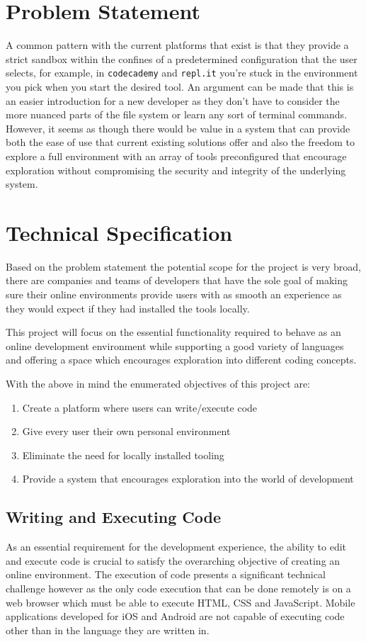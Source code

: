\section{Problem Statement} \label{section:probart-probstate}
A common pattern with the current platforms that exist is that they provide a strict sandbox within the confines of a predetermined configuration that the user selects, for example, in \texttt{codecademy} and \texttt{repl.it} you're stuck in the environment you pick when you start the desired tool. An argument can be made that this is an easier introduction for a new developer as they don't have to consider the more nuanced parts of the file system or learn any sort of terminal commands. However, it seems as though there would be value in a system that can provide both the ease of use that current existing solutions offer and also the freedom to explore a full environment with an array of tools preconfigured that encourage exploration without compromising the security and integrity of the underlying system.

\section{Technical Specification} \label{section:probart-techspec}
Based on the problem statement the potential scope for the project is very broad, there are companies and teams of developers that have the sole goal of making sure their online environments provide users with as smooth an experience as they would expect if they had installed the tools locally.

This project will focus on the essential functionality required to behave as an online development environment while supporting a good variety of languages and offering a space which encourages exploration into different coding concepts.

With the above in mind the enumerated objectives of this project are: 
\begin{enumerate}
    \item Create a platform where users can write/execute code
    \item Give every user their own personal environment
    \item Eliminate the need for locally installed tooling
    \item Provide a system that encourages exploration into the world of development
\end{enumerate}

\subsection{Writing and Executing Code}
As an essential requirement for the development experience, the ability to edit and execute code is crucial to satisfy the overarching objective of creating an online environment. The execution of code presents a significant technical challenge however as the only code execution that can be done remotely is on a web browser which must be able to execute HTML, CSS and JavaScript. Mobile applications developed for iOS and Android are not capable of executing code other than in the language they are written in.

